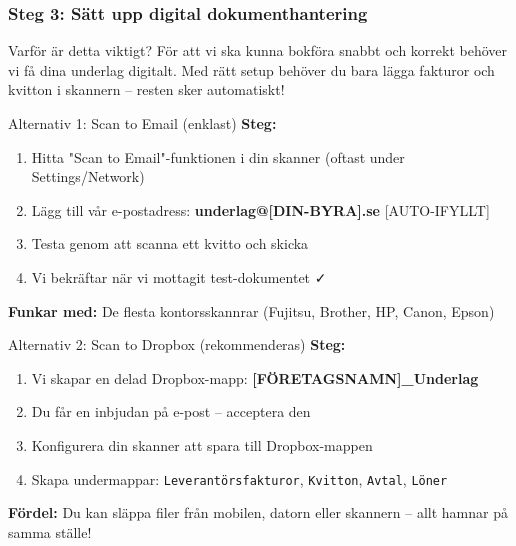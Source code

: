 \documentclass[10pt]{beamer}
\begin{document}
\begin{frame}[fragile]
  \frametitle{Steg 3: Sätt upp digital dokumenthantering}

  \begin{block}{Varför är detta viktigt?}
    \vspace{0.2cm}
    För att vi ska kunna bokföra snabbt och korrekt behöver vi få dina underlag digitalt.
    Med rätt setup behöver du bara lägga fakturor och kvitton i skannern – resten sker automatiskt!
  \end{block}

  \vspace{0.4cm}

  \begin{block}{Alternativ 1: Scan to Email (enklast)}
    \footnotesize
    \textbf{Steg:}
    \begin{enumerate}
      \item Hitta "Scan to Email"-funktionen i din skanner (oftast under Settings/Network)
      \item Lägg till vår e-postadress: \textbf{underlag@[DIN-BYRA].se} [AUTO-IFYLLT]
      \item Testa genom att scanna ett kvitto och skicka
      \item Vi bekräftar när vi mottagit test-dokumentet ✓
    \end{enumerate}
    \textbf{Funkar med:} De flesta kontorsskannrar (Fujitsu, Brother, HP, Canon, Epson)
  \end{block}

  \vspace{0.4cm}

  \begin{block}{Alternativ 2: Scan to Dropbox (rekommenderas)}
    \footnotesize
    \textbf{Steg:}
    \begin{enumerate}
      \item Vi skapar en delad Dropbox-mapp: \textbf{[FÖRETAGSNAMN]\_Underlag}
      \item Du får en inbjudan på e-post – acceptera den
      \item Konfigurera din skanner att spara till Dropbox-mappen
      \item Skapa undermappar: \texttt{Leverantörsfakturor}, \texttt{Kvitton}, \texttt{Avtal}, \texttt{Löner}
    \end{enumerate}
    \textbf{Fördel:} Du kan släppa filer från mobilen, datorn eller skannern – allt hamnar på samma ställe!
  \end{block}

  \vspace{0.4cm}
  \begin{center}
  \end{center}

\end{frame}
\end{document}
